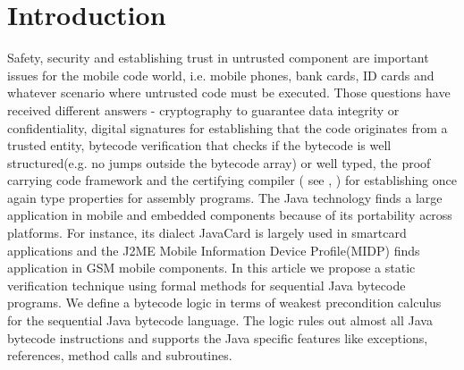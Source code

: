 
\section{Introduction}\label{intro}
Safety, security and establishing trust in untrusted component are important issues for the mobile code world, 
i.e. mobile phones, bank cards, ID cards and whatever scenario where 
untrusted code must be executed. Those questions have received different answers - cryptography to guarantee data integrity or confidentiality,
 digital signatures for establishing that the code originates from a trusted entity, bytecode verification that checks if the bytecode 
 is well structured(e.g. no jumps outside the bytecode array) or well typed, 
 the proof carrying code framework  and the certifying compiler ( see  \cite{ComNec},\cite{DesNecLee98} ) for establishing once 
 again type properties for assembly programs.  
The Java technology finds a large application in mobile and embedded components because of its portability across platforms. For instance, its dialect JavaCard is largely used in smartcard applications and the J2ME Mobile Information Device Profile(MIDP) finds application in GSM mobile components. 
  In this article we propose a static verification technique using formal methods for sequential Java bytecode programs.
We define a bytecode logic in terms of weakest precondition calculus for the sequential Java bytecode language. The logic rules out 
almost all Java bytecode instructions and supports the Java specific features like 
exceptions, references, method calls and subroutines.  
 
